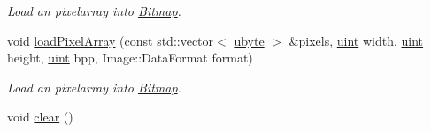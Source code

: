 \begin{DoxyCompactItemize}
\begin{DoxyCompactList}\small\item\em Load an pixelarray into \hyperlink{class_f2_c_1_1_bitmap}{Bitmap}. \item\end{DoxyCompactList}\item 
void \hyperlink{class_f2_c_1_1_bitmap_ae707e2e499d1bc72465be4ac739bccfa}{loadPixelArray} (const std::vector$<$ \hyperlink{namespace_f2_c_a74fad364688add30796d711e5635ac77}{ubyte} $>$ \&pixels, \hyperlink{namespace_f2_c_a58be2bac9eb3e3c99cb41b6008bf4fae}{uint} width, \hyperlink{namespace_f2_c_a58be2bac9eb3e3c99cb41b6008bf4fae}{uint} height, \hyperlink{namespace_f2_c_a58be2bac9eb3e3c99cb41b6008bf4fae}{uint} bpp, Image::DataFormat format)
\begin{DoxyCompactList}\small\item\em Load an pixelarray into \hyperlink{class_f2_c_1_1_bitmap}{Bitmap}. \item\end{DoxyCompactList}\item 
\hypertarget{class_f2_c_1_1_bitmap_a813d77416c70e0030659a67d490d29e0}{
void \hyperlink{class_f2_c_1_1_bitmap_a813d77416c70e0030659a67d490d29e0}{clear} ()}
\label{class_f2_c_1_1_bitmap_a813d77416c70e0030659a67d490d29e0}


\end{DoxyCompactItemize}
